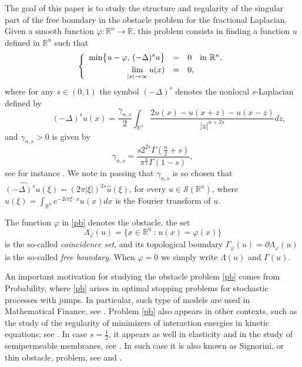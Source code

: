 \documentclass[11pt]{amsart}
\theoremstyle{plain}
\numberwithin{equation}{section}
\begin{document}
The goal of this paper is to study the structure and regularity of the singular part of the free boundary in the obstacle problem for the fractional Laplacian.
Given a smooth function $\varphi :{\mathbb R}^n\to {\mathbb R}$,  this problem consists in finding a function $u$ defined in ${\mathbb R^n}$ such that
\begin{equation}\label{pb}
\left\{\begin{array}{rcl}
\displaystyle\min\bigl\{ u-\varphi,\,(-\Delta)^su\bigr\}&=&0\quad \textrm{in}\ {\mathbb R}^n,\vspace{1mm}\\
\displaystyle\lim_{|x|\to\infty}u(x)&=&0,
\end{array}\right.
\end{equation}
where for any $s\in(0,1)$ the symbol $(-\Delta)^s$ denotes the nonlocal  $s$-Laplacian defined by
\begin{equation}\label{fl}
\qquad\qquad (-\Delta)^s u(x)= \frac{\gamma_{n,s}}{2} \int_{{\mathbb R}^n} \frac{2u(x)-u(x+z) - u(x-z)}{|z|^{n+2s}} dz, 
\end{equation}
and $\gamma_{n,s}>0$ is given by
\[
\gamma_{n,s} = \frac{s 2^{2s} \Gamma(\frac n2 + s)}{\pi^{\frac n2} \Gamma(1-s)},
\]
see for instance \cite{L}. We note in passing that $\gamma_{n,s}$ is so chosen that $\widehat{(-\Delta)^s u}(\xi) = (2\pi |\xi|)^{2s} \hat u(\xi)$, for every $u\in \mathcal S({\mathbb R^n})$, where $\hat u(\xi) = \int_{\mathbb R^n} e^{-2i\pi \xi\cdot x} u(x) dx$ is the Fourier transform of $u$. 

The function ${\varphi}$ in \eqref{pb} denotes the obstacle, the set 
\[
 \Lambda_{\varphi}(u) = \{x\in {\mathbb R^n}\,:\, u(x) = {\varphi}(x)\}
 \]
 is the so-called \emph{coincidence set}, and its topological boundary $\Gamma_{\varphi}(u) = \partial \Lambda_{\varphi}(u)$ is the so-called \emph{free boundary}. 
When $\varphi = 0$ we simply write $\Lambda(u)$ and $\Gamma(u)$.

An important motivation for studying the obstacle problem \eqref{pb} comes from Probability, where \eqref{pb} arises in optimal stopping problems for stochastic processes with jumps.
In particular, such type of models are used in Mathematical Finance, see \cite{CT}.
Problem \eqref{pb} also appears in other contexts, such as the study of the regularity of minimizers of interaction energies in kinetic equations; see \cite{CDM}.
In case $s=\frac12$, it appears as well in elasticity and in the study of semipermeable membranes, see \cite{DL}.
In such case it is also known as Signorini, or thin obstacle, problem, see \cite{F} and \cite{Fr}.
\end{document}
